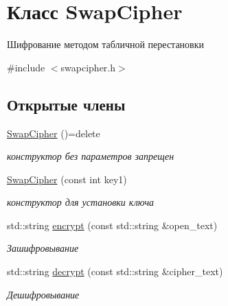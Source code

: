 \hypertarget{classSwapCipher}{}\section{Класс Swap\+Cipher}
\label{classSwapCipher}


Шифрование методом табличной перестановки  




{\ttfamily \#include $<$swapcipher.\+h$>$}

\subsection*{Открытые члены}
\begin{DoxyCompactItemize}
\item 
\mbox{\label{classSwapCipher_a833505a4c3a4e35bd29221fdc0721479}} 
\hyperlink{classSwapCipher_a833505a4c3a4e35bd29221fdc0721479}{Swap\+Cipher} ()=delete
\begin{DoxyCompactList}\small\item\em конструктор без параметров запрещен \end{DoxyCompactList}\item 
\mbox{\label{classSwapCipher_ad13cc690789eb715e51b2dc6b002c494}} 
\hyperlink{classSwapCipher_ad13cc690789eb715e51b2dc6b002c494}{Swap\+Cipher} (const int key1)
\begin{DoxyCompactList}\small\item\em конструктор для установки ключа \end{DoxyCompactList}\item 
std\+::string \hyperlink{classSwapCipher_adab0495fb3203c0214143969d9945573}{encrypt} (const std\+::string \&open\+\_\+text)
\begin{DoxyCompactList}\small\item\em Зашифровывание \end{DoxyCompactList}\item 
std\+::string \hyperlink{classSwapCipher_a198011fc3328030ef7c2493cd0b5abeb}{decrypt} (const std\+::string \&cipher\+\_\+text)
\begin{DoxyCompactList}\small\item\em Дешифровывание \end{DoxyCompactList}\end{DoxyCompactItemize}
